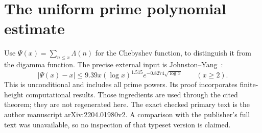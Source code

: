 \documentclass[11pt]{article}
\theoremstyle{remark}\newtheorem{remark}[theorem]{Remark}
\numberwithin{equation}{section}
\begin{document}
\section{The uniform prime polynomial estimate}\label{sec:arithmetic}
Use $\Psi(x)=\sum_{n\le x}\Lambda(n)$ for the Chebyshev function, to distinguish it from the digamma function. The precise external input is Johnston--Yang~\cite[Theorem~1.1, p.~2]{JY}:
\begin{equation}\label{eq:JY}
 |\Psi(x)-x|\le9.39x(\log x)^{1.515}e^{-0.8274\sqrt{\log x}}
 \qquad(x\ge2).
\end{equation}
This is unconditional and includes all prime powers. Its proof incorporates finite-height computational results. Those ingredients are used through the cited theorem; they are not regenerated here. The exact checked primary text is the author manuscript arXiv:2204.01980v2. A comparison with the publisher's full text was unavailable, so no inspection of that typeset version is claimed.
\end{document}
